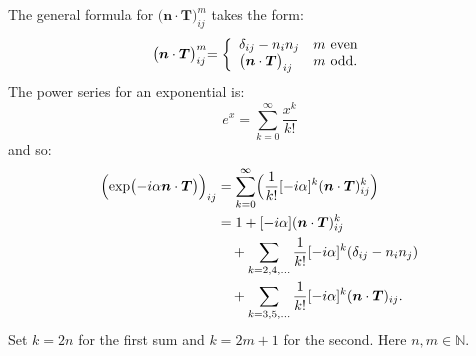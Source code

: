 \begin{enumerate}
    The general formula for $\bigl(\boldsymbol{n}\cdot\boldsymbol{T}\bigl)^m_{ij}$
    takes the form:
    $$\bigl(\boldsymbol{n}\cdot\boldsymbol{T}\bigl)^m_{ij} =
    \left\{
	\begin{array}{ll}
		\delta_{ij}-n_i n_j  & m\hspace{0.05in}\text{even} \\
		\bigl(\boldsymbol{n}\cdot\boldsymbol{T}\bigl)_{ij} & m\hspace{0.05in}\text{odd}.
	\end{array}
    \right.$$
    The power series for an exponential is:
    $$e^x=\sum_{k=0}^{\infty}\frac{x^k}{k!}$$
    and so:
    \begin{align*}
        \Bigl(\exp\bigl(-i\alpha\boldsymbol{n}\cdot\boldsymbol{T}\bigl)\Bigl)_{ij}
        &=\sum_{k=0}^{\infty}\Bigl(\frac{1}{k!}[-i\alpha]^k
        (\boldsymbol{n}\cdot\boldsymbol{T})^k_{ij}\Bigl) \\
        &=1+[-i\alpha](\boldsymbol{n}\cdot\boldsymbol{T})^k_{ij} \\
        &\quad+\sum_{k=2,4,\dots}\frac{1}{k!}[-i\alpha]^k
        (\delta_{ij}-n_i n_j) \\
        &\quad+\sum_{k=3,5,\dots}\frac{1}{k!}[-i\alpha]^k
        (\boldsymbol{n}\cdot\boldsymbol{T})_{ij}.
    \end{align*}
    Set $k=2n$ for the first sum and $k=2m+1$ for the second. Here $n,m\in\mathbb{N}$.

    \newpage


\end{enumerate}
